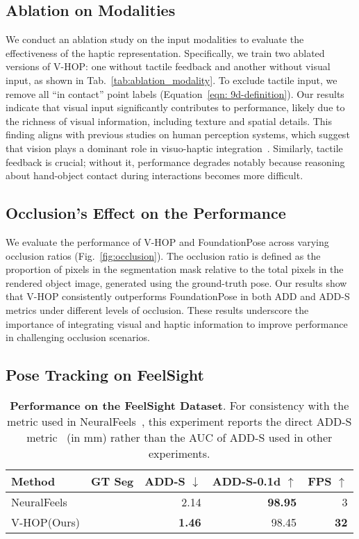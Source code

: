 \documentclass[11pt, a4paper, logo, twocolumn]{brown}
\newcommand{\autosizeTable}[1]{%
    \begin{adjustbox}{max width=\linewidth}
        #1
    \end{adjustbox}
}
\newcommand{\shortname}{V-HOP\xspace}
\newcommand{\cmark}{\ding{51}}%
\newcommand{\xmark}{\ding{55}}%
\begin{document}
\subsection{Ablation on Modalities}
We conduct an ablation study on the input modalities to evaluate the effectiveness of the haptic representation.
Specifically, we train two ablated versions of \shortname: one without tactile feedback and another without visual input, as shown in Tab.~\ref{tab:ablation_modality}.
To exclude tactile input, we remove all ``in contact'' point labels (Equation~\ref{eqn: 9d-definition}).
Our results indicate that visual input significantly contributes to performance, likely due to the richness of visual information, including texture and spatial details.
This finding aligns with previous studies on human perception systems, which suggest that vision plays a dominant role in visuo-haptic integration~\cite{kassuba_vision_2013}.
Similarly, tactile feedback is crucial; without it, performance degrades notably because reasoning about hand-object contact during interactions becomes more difficult.

\subsection{Occlusion's Effect on the Performance}

We evaluate the performance of \shortname and FoundationPose across varying occlusion ratios (Fig.~\ref{fig:occlusion}).
The occlusion ratio is defined as the proportion of pixels in the segmentation mask relative to the total pixels in the rendered object image, generated using the ground-truth pose.
Our results show that \shortname consistently outperforms FoundationPose in both ADD and ADD-S metrics under different levels of occlusion.
These results underscore the importance of integrating visual and haptic information to improve performance in challenging occlusion scenarios.

\subsection{Pose Tracking on FeelSight}
\label{sec: feelsight}

\begin{table}[t!]
\centering
\autosizeTable{
\begin{tabular}{l | c | r | r | r}
\hline
Method & GT Seg & ADD-S $\downarrow$ & ADD-S-0.1d $\uparrow$ & FPS $\uparrow$ \\ \hline
NeuralFeels~\cite{suresh_neuralfeels_2024} & \cmark & 2.14  & \cellcolor{gold} \textbf{98.95}  & 3 \\ 
\shortname (Ours) & \xmark & \cellcolor{gold} \textbf{1.46} & 98.45  & \cellcolor{gold} \textbf{32}  \\ 
\hline
\end{tabular}
}
\caption{
\textbf{Performance on the FeelSight Dataset}.
For consistency with the metric used in NeuralFeels~\cite{suresh_neuralfeels_2024}, this experiment reports the direct ADD-S metric~\cite{xiang_posecnn_2018} (in mm) rather than the AUC of ADD-S used in other experiments. 
}
\label{tab:feelsight}
\end{table}
\end{document}
